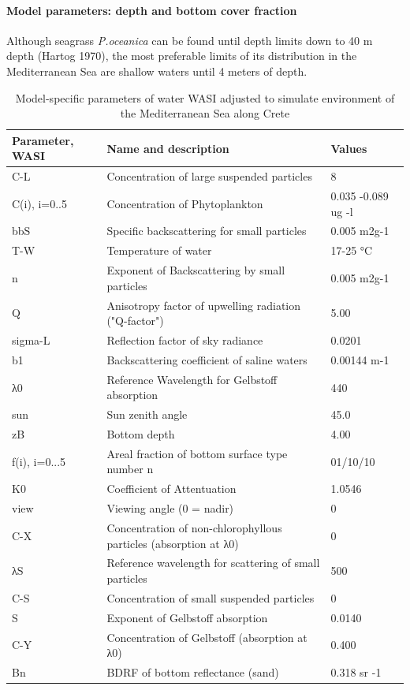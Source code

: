 \documentclass[11pt]{article}
\begin{document}
\paragraph{Model parameters: depth and bottom cover fraction}
Although seagrass \textit{P.oceanica} can be found until depth limits down to 40 m depth (Hartog
1970), the most preferable limits of its distribution in the Mediterranean Sea are shallow waters until
4 meters of depth. 

\begin{table}
	\caption{Model-specific parameters of water WASI adjusted to simulate environment of the Mediterranean Sea along Crete}
	\centering
	 \begin{tabular}{|  p{2cm} | p{6cm} | p{25mm} | }
	    \hline
		    \textbf{Parameter, WASI} & \textbf{Name and description} & \textbf{Values} \\ \hline\hline
		    C-L & Concentration of large suspended particles & 8 \\ \hline
		   C(i), i=0..5 & Concentration of Phytoplankton & 0.035 -0.089 ug -l \\ \hline
		    bbS & Specific backscattering for small particles & 0.005 m2g-1 \\ \hline
		   T-W & Temperature of water & 17-25 °C \\ \hline
		    n & Exponent of Backscattering by small particles & 0.005 m2g-1 \\ \hline
		    Q &Anisotropy factor of upwelling radiation ("Q-factor") & 5.00 \\ \hline
		    sigma-L & Reflection factor of sky radiance & 0.0201 \\ \hline
		    b1 & Backscattering coefficient of saline waters & 0.00144 m-1 \\ \hline
		    λ0 & Reference Wavelength for Gelbstoff absorption & 440 \\ \hline
		    sun & Sun zenith angle & 45.0 \\ \hline
		    zB & Bottom depth & 4.00 \\ \hline
		   f(i), i=0...5 & Areal fraction of bottom surface type number n & 01/10/10 \\ \hline
		    K0 & Coefficient of Attentuation & 1.0546 \\ \hline
		   view & Viewing angle (0 = nadir) & 0\\ \hline
		    C-X & Concentration of non-chlorophyllous particles (absorption at λ0) & 0 \\ \hline
		   λS & Reference wavelength for scattering of small particles & 500 \\ \hline
		    C-S & Concentration of small suspended particles & 0 \\ \hline
		   S & Exponent of Gelbstoff absorption & 0.0140 \\ \hline
		    C-Y & Concentration of Gelbstoff (absorption at λ0) & 0.400 \\ \hline
		    Bn & BDRF of bottom reflectance (sand) & 0.318 sr -1\\
	    \hline
	  \end{tabular}
	   \label{tab:3}
\end{table}
\end{document}
